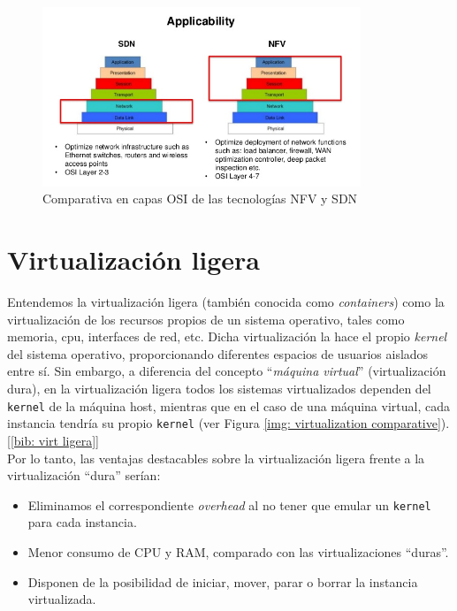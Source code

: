 \documentclass[a4paper, oneside, 12pt]{book}
\begin{document}
	\begin{figure}[h!]
		\begin{center}
			\includegraphics[width=0.85\textwidth]{img/sdn-y-nfv.jpg}
			\caption{Comparativa en capas OSI de las tecnologías NFV y SDN}
			\label{img: sdn + nfv}
		\end{center}
	\end{figure}

	\pagebreak
	
	\section{Virtualización ligera}
	\label{sect: virt ligera}
	
	\noindent Entendemos la virtualización ligera (también conocida como \textit{containers}) como la virtualización de los recursos propios de un sistema operativo, tales como memoria, cpu, interfaces de red, etc. Dicha virtualización la hace el propio \textit{kernel} del sistema operativo, proporcionando diferentes espacios de usuarios aislados entre sí. Sin embargo, a diferencia del concepto ``\textit{máquina virtual}'' (virtualización dura), en la virtualización ligera todos los sistemas virtualizados dependen del \texttt{kernel} de la máquina host, mientras que en el caso de una máquina virtual, cada instancia tendría su propio \texttt{kernel} (ver Figura \ref{img: virtualization comparative}). [\ref{bib: virt ligera}]\\
	
	\noindent Por lo tanto, las ventajas destacables sobre la virtualización ligera frente a la virtualización ``dura'' serían:
	\begin{itemize}
		\item Eliminamos el correspondiente \textit{overhead} al no tener que emular un \texttt{kernel} para cada instancia.
		\item Menor consumo de CPU y RAM, comparado con las virtualizaciones ``duras''.
		\item Disponen de la posibilidad de iniciar, mover, parar o borrar la instancia virtualizada.
	\end{itemize}
	
\end{document}
